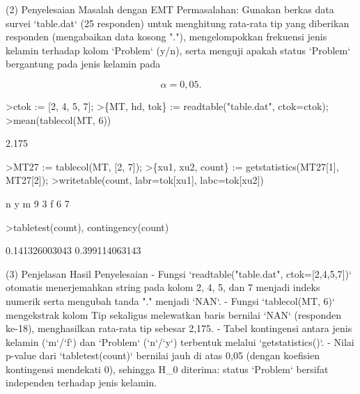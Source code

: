 \documentclass{article}
\newenvironment{eulernotebook}{\par}{\par}
\newenvironment{eulercomment}{\par\medskip}{\par\medskip}
\newenvironment{eulerformula}{}{}
\begin{document}
\begin{eulernotebook}
\begin{eulercomment}
\begin{eulercomment}
\begin{eulercomment}
\begin{eulercomment}
\begin{eulercomment}
\begin{eulercomment}
\begin{eulercomment}
(2) Penyelesaian Masalah dengan EMT Permasalahan: Gunakan berkas data
survei `table.dat` (25 responden) untuk menghitung rata-rata tip yang
diberikan responden (mengabaikan data kosong "."), mengelompokkan
frekuensi jenis kelamin terhadap kolom `Problem` (y/n), serta menguji
apakah status `Problem` bergantung pada jenis kelamin pada\\
\end{eulercomment}
\begin{eulerformula}
\[
\alpha = 0,05.
\]
\end{eulerformula}
\begin{eulerprompt}
>ctok := [2, 4, 5, 7];
>\{MT, hd, tok\} := readtable("table.dat", ctok=ctok);
>mean(tablecol(MT, 6))
\end{eulerprompt}
\begin{euleroutput}
  2.175
\end{euleroutput}
\begin{eulerprompt}
>MT27 := tablecol(MT, [2, 7]);
>\{xu1, xu2, count\} := getstatistics(MT27[1], MT27[2]);
>writetable(count, labr=tok[xu1], labc=tok[xu2])
\end{eulerprompt}
\begin{euleroutput}
                     n         y
           m         9         3
           f         6         7
\end{euleroutput}
\begin{eulerprompt}
>tabletest(count), contingency(count)
\end{eulerprompt}
\begin{euleroutput}
  0.141326003043
  0.399114063143
\end{euleroutput}
\begin{eulercomment}
(3) Penjelasan Hasil Penyelesaian
- Fungsi `readtable("table.dat", ctok=[2,4,5,7])` otomatis menerjemahkan string pada kolom 2, 4, 5, dan 7 menjadi indeks numerik serta mengubah tanda "." menjadi `NAN`.
- Fungsi `tablecol(MT, 6)` mengekstrak kolom Tip sekaligus melewatkan baris bernilai `NAN` (responden ke-18), menghasilkan rata-rata tip sebesar 2,175.
- Tabel kontingensi antara jenis kelamin (`m`/`f`) dan `Problem` (`n`/`y`) terbentuk melalui `getstatistics()`.
- Nilai p-value dari `tabletest(count)` bernilai jauh di atas 0,05 (dengan koefisien kontingensi mendekati 0), sehingga \textdollar{}H\_0\textdollar{} diterima: status `Problem` bersifat independen terhadap jenis kelamin.


\end{eulercomment}
\end{eulercomment}
\end{eulercomment}
\end{eulercomment}
\end{eulercomment}
\end{eulercomment}
\end{eulercomment}
\end{eulernotebook}
\end{document}
